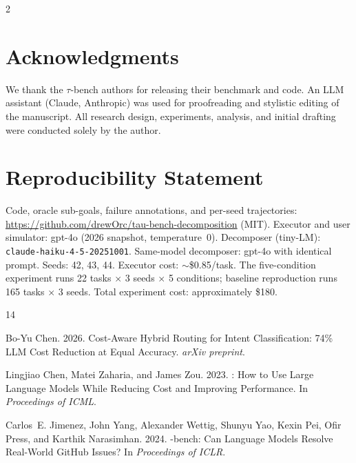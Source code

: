 \documentclass[11pt,a4paper]{article}
\begin{document}
\begin{multicols}{2}
\section*{Acknowledgments}

We thank the $\tau$-bench authors for releasing their benchmark and code. An LLM assistant (Claude, Anthropic) was used for proofreading and stylistic editing of the manuscript. All research design, experiments, analysis, and initial drafting were conducted solely by the author.

\section*{Reproducibility Statement}

Code, oracle sub-goals, failure annotations, and per-seed trajectories: \url{https://github.com/drewOrc/tau-bench-decomposition} (MIT). Executor and user simulator: gpt-4o (2026 snapshot, temperature~0). Decomposer (tiny-LM): \texttt{claude-haiku-4-5-20251001}. Same-model decomposer: gpt-4o with identical prompt. Seeds: 42, 43, 44. Executor cost: ${\sim}$\$0.85/task. The five-condition experiment runs 22 tasks $\times$ 3 seeds $\times$ 5 conditions; baseline reproduction runs 165 tasks $\times$ 3 seeds. Total experiment cost: approximately \$180.


\begin{thebibliography}{14}

Bo-Yu Chen. 2026.
\newblock Cost-Aware Hybrid Routing for Intent Classification: 74\% {LLM} Cost Reduction at Equal Accuracy.
\newblock \emph{arXiv preprint}.

Lingjiao Chen, Matei Zaharia, and James Zou. 2023.
: How to Use Large Language Models While Reducing Cost and Improving Performance.
\newblock In \emph{Proceedings of ICML}.

Carlos~E. Jimenez, John Yang, Alexander Wettig, Shunyu Yao, Kexin Pei, Ofir Press, and Karthik Narasimhan. 2024.
-bench: Can Language Models Resolve Real-World {GitHub} Issues?
\newblock In \emph{Proceedings of ICLR}.


\end{thebibliography}
\end{multicols}
\end{document}
